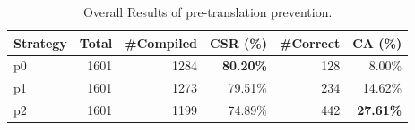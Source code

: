 \begin{table}[t]
\centering
\caption{Overall Results of pre-translation prevention.}
\label{tab:pre_overall}
\begin{tabular}{lrrrrr}
\toprule
Strategy & Total & \#Compiled & CSR (\%) & \#Correct & CA (\%) \\
\midrule
p0 & 1601 & 1284 & \textbf{80.20\%} & 128 & 8.00\% \\
p1 & 1601 & 1273 & 79.51\% & 234 & 14.62\% \\
p2 & 1601 & 1199 & 74.89\% & 442 & \textbf{27.61\%} \\
\bottomrule
\end{tabular}
\end{table}
